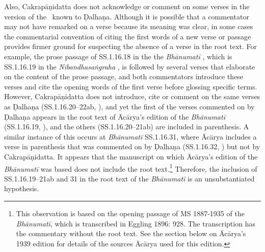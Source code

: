 Also, Cakrapāṇidatta does not acknowledge or comment on some verses in the version of the \SS\ known to Ḍalhaṇa. Although it is possible that a commentator may not have remarked on a verse because its meaning was clear, in some cases the commentarial convention of citing the first words of a new verse or passage provides firmer ground for suspecting the absence of a verse in the root text. For example, the prose passage of SS.1.16.18 in the the \emph{Bhānumatī} \citep[130]{acar-1939}, which is SS.1.16.19 in the \emph{Nibandhasaṅgraha} \citep[79]{vulgate}, is followed by several verses that elaborate on the content of the prose passage, and both commentators introduce these verses and cite the opening words of the first verse before glossing specific terms. However, Cakrapāṇidatta does not introduce, cite or comment on the same verses as Ḍalhaṇa (SS.1.16.20–22ab, \cite[79]{vulgate}), and yet the first of the verses commented on by Ḍalhaṇa appears in the root text of Ācārya's edition of the \emph{Bhānumatī} (SS.1.16.19, \cite[130]{acar-1939}), and the others (SS.1.16.20–21ab) are included in parenthesis. A similar instance of this occurs at \emph{Bhānumatī} SS.1.16.31, where Ācārya includes a verse in parenthesis that was commented on by Ḍalhaṇa (SS.1.16.32, \cite[81]{vulgate}) but not by Cakrapāṇidatta. It appears that the manuscript on which Ācārya's edition of the \emph{Bhānumatī} was based does not include the root text.\footnote{This observation is based on the opening passage of MS 1887-1935 of the \emph{Bhānumatī}, which is transcribed in Eggling 1896: 928. The transcription has the commentary without the root text. See the section below on Ācārya's 1939 edition for details of the sources Ācārya used for this edition.} Therefore, the inclusion of SS.1.16.19–21ab and 31 in the root text of the \emph{Bhānumatī} is an unsubstantiated hypothesis. 


